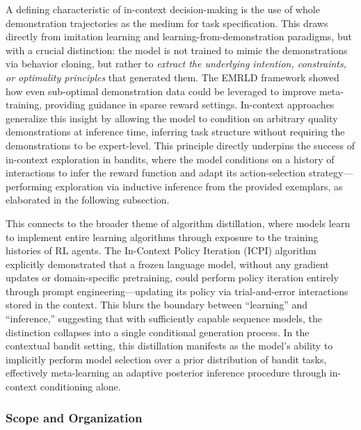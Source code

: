 \documentclass[11pt]{article}
\begin{document}
A defining characteristic of in-context decision-making is the use of whole demonstration trajectories as the medium for task specification. This draws directly from imitation learning and learning-from-demonstration paradigms, but with a crucial distinction: the model is not trained to mimic the demonstrations via behavior cloning, but rather to \emph{extract the underlying intention, constraints, or optimality principles} that generated them. The EMRLD framework \cite{ref317} showed how even sub-optimal demonstration data could be leveraged to improve meta-training, providing guidance in sparse reward settings. In-context approaches generalize this insight by allowing the model to condition on arbitrary quality demonstrations at inference time, inferring task structure without requiring the demonstrations to be expert-level. This principle directly underpins the success of in-context exploration in bandits, where the model conditions on a history of interactions to infer the reward function and adapt its action-selection strategy---performing exploration via inductive inference from the provided exemplars, as elaborated in the following subsection.

This connects to the broader theme of algorithm distillation, where models learn to implement entire learning algorithms through exposure to the training histories of RL agents. The In-Context Policy Iteration (ICPI) algorithm \cite{ref307} explicitly demonstrated that a frozen language model, without any gradient updates or domain-specific pretraining, could perform policy iteration entirely through prompt engineering---updating its policy via trial-and-error interactions stored in the context. This blurs the boundary between ``learning'' and ``inference,'' suggesting that with sufficiently capable sequence models, the distinction collapses into a single conditional generation process. In the contextual bandit setting, this distillation manifests as the model's ability to implicitly perform model selection over a prior distribution of bandit tasks, effectively meta-learning an adaptive posterior inference procedure through in-context conditioning alone.

\subsubsection{Scope and Organization}
\end{document}
